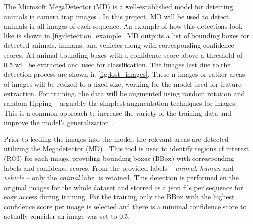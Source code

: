         The Microsoft MegaDetector (MD) is a well-established model for detecting animals in camera trap images \autocite{hernandezPytorchWildlifeCollaborativeDeep2024a, velezChoosingAppropriatePlatform2022, schneiderRecognitionEuropeanMammals2024}.
        In this project, MD will be used to detect animals in all images of each sequence.
        An example of how this detections look like is shown in \autoref{fig:detection_example}.
        MD outputs a list of bounding boxes for detected animals, humans, and vehicles along with corresponding confidence scores. 
        All animal bounding boxes with a confidence score above a threshold of 0.5 will be extracted and used for classification.
        The images lost due to the detection process are shown in \autoref{fig:lost_images}.
        These n images or rather areas of images will be resized to a fixed size, working for the model used for feature extraction. 
        For training, the data will be augmented using random rotation and random flipping -- arguably the simplest augmentation techniques for images. 
        This is a common approach to increase the variety of the training data and improve the model's generalization \autocite{shortenSurveyImageData2019}.

        Prior to feeding the images into the model, the relevant areas are detected utilizing the Megadetector (MD) \autocite{morrisEfficientPipelineCamera2025}. 
        This tool is used to identify regions of interest (ROI) for each image, providing bounding boxes (BBox) with corresponding labels and confidence scores.
        From the provided labels -- \textit{animal}, \textit{human} and \textit{vehicle} -- only the \textit{animal} label is retained.
        This detection is performed on the original images for the whole dataset and storred as a json file per sequence for easy access during training.
        For the training only the BBox with the highest confidence score per image is selected and there is a minimal confidence score to actually concider an image was set to 0.5.

